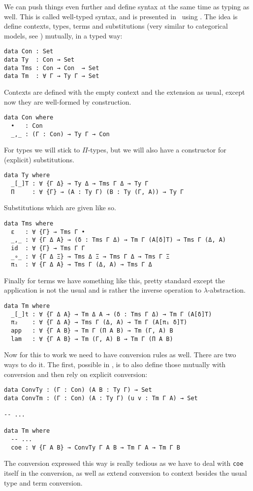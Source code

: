 We can push things even further and define syntax at the same time as typing
as well. This is called well-typed syntax, and is presented
in~ using .
The idea is define contexts, types, terms and substitutions (very similar to
categorical models, see ) mutually, in a typed way:
\begin{verbatim}
data Con : Set
data Ty  : Con → Set
data Tms : Con → Con  → Set
data Tm  : ∀ Γ → Ty Γ → Set
\end{verbatim}
Contexts are defined with the empty context and the extension as usual, except
now they are well-formed by construction.
\begin{verbatim}
data Con where
  •   : Con
  _,_ : (Γ : Con) → Ty Γ → Con
\end{verbatim}
For types we will stick to \(\Pi\)-types, but we will also have a constructor
for (explicit) substitutions.
\begin{verbatim}
data Ty where
  _[_]T : ∀ {Γ Δ} → Ty Δ → Tms Γ Δ → Ty Γ
  Π     : ∀ {Γ} → (A : Ty Γ) (B : Ty (Γ, A)) → Ty Γ
\end{verbatim}
Substitutions which are given like so.
\begin{verbatim}
data Tms where
  ε   : ∀ {Γ} → Tms Γ •
  _,_ : ∀ {Γ Δ A} → (δ : Tms Γ Δ) → Tm Γ (A[δ]T) → Tms Γ (Δ, A)
  id  : ∀ {Γ} → Tms Γ Γ
  _∘_ : ∀ {Γ Δ Ξ} → Tms Δ Ξ → Tms Γ Δ → Tms Γ Ξ
  π₁  : ∀ {Γ Δ A} → Tms Γ (Δ, A) → Tms Γ Δ
\end{verbatim}
Finally for terms we have something like this, pretty standard except the
application is not the usual and is rather the inverse operation to
\(\lambda\)-abstraction.
\begin{verbatim}
data Tm where
  _[_]t : ∀ {Γ Δ A} → Tm Δ A → (δ : Tms Γ Δ) → Tm Γ (A[δ]T)
  π₂    : ∀ {Γ Δ A} → Tms Γ (Δ, A) → Tm Γ (A[π₁ δ]T)
  app   : ∀ {Γ A B} → Tm Γ (Π A B) → Tm (Γ, A) B
  lam   : ∀ {Γ A B} → Tm (Γ, A) B → Tm Γ (Π A B)
\end{verbatim}

Now for this to work we need to have conversion rules as well. There are two
ways to do it. The first, possible in \Agda, is to also define those mutually
with conversion and then rely on explicit conversion:
\begin{verbatim}
data ConvTy : (Γ : Con) (A B : Ty Γ) → Set
data ConvTm : (Γ : Con) (A : Ty Γ) (u v : Tm Γ A) → Set

-- ...

data Tm where
  -- ...
  coe : ∀ {Γ A B} → ConvTy Γ A B → Tm Γ A → Tm Γ B
\end{verbatim}
The conversion expressed this way is really tedious as we have to deal with
\texttt{coe} itself in the conversion, as well as extend conversion to
context besides the usual type and term conversion.

